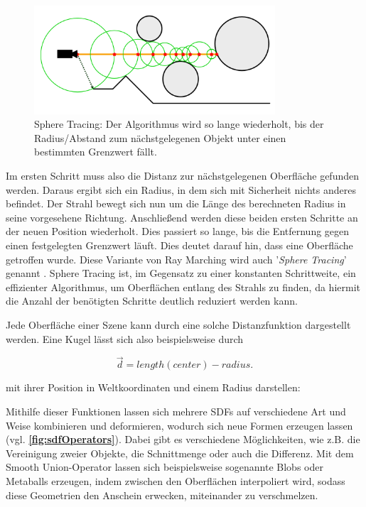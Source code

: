 \begin{figure}[!h]
	\centering
	\includegraphics[width=0.80\textwidth]{Grafiken/Basics/Volume/Sphere_Tracing.png}
	\begin{footnotesize}
		\caption{Sphere Tracing: Der Algorithmus wird so lange wiederholt, bis der Radius/Abstand zum nächstgelegenen
			Objekt unter einen bestimmten Grenzwert fällt.}
	\end{footnotesize}
\end{figure}


Im ersten Schritt muss also die Distanz zur nächstgelegenen Oberfläche gefunden werden. Daraus ergibt sich ein Radius, in dem sich
mit Sicherheit nichts anderes befindet. Der Strahl bewegt sich nun um die Länge des berechneten Radius in seine vorgesehene Richtung.
Anschließend werden diese beiden ersten Schritte an der neuen Position wiederholt. Dies passiert so lange, bis die Entfernung gegen einen festgelegten
Grenzwert läuft. Dies deutet darauf hin, dass eine Oberfläche getroffen wurde. Diese Variante von Ray Marching wird auch
'\textit{Sphere Tracing}' genannt \parencite{Hart96}. Sphere Tracing ist, im Gegensatz zu einer konstanten Schrittweite, ein effizienter Algorithmus,
um Oberflächen entlang des Strahls zu finden, da hiermit die Anzahl der benötigten Schritte deutlich reduziert werden kann.

Jede Oberfläche einer Szene kann durch eine solche Distanzfunktion dargestellt werden.
Eine Kugel lässt sich also beispielsweise durch 

\vspace{-0.3cm  }
\begin{equation}
	\label{eqn:sdf}
	\vec{d} = length(center) - radius.
\end{equation}

mit ihrer Position in Weltkoordinaten und einem Radius darstellen:



Mithilfe dieser Funktionen lassen sich mehrere SDFs auf verschiedene Art und Weise kombinieren und deformieren, wodurch sich neue Formen
erzeugen lassen (vgl. \textbf{\autoref{fig:sdfOperators}}).
Dabei gibt es verschiedene Möglichkeiten, wie z.B. die Vereinigung zweier Objekte, die Schnittmenge oder auch die Differenz.
Mit dem Smooth Union-Operator lassen sich beispielsweise sogenannte Blobs oder Metaballs erzeugen, indem zwischen
den Oberflächen interpoliert wird, sodass diese Geometrien den Anschein erwecken, miteinander zu verschmelzen.

